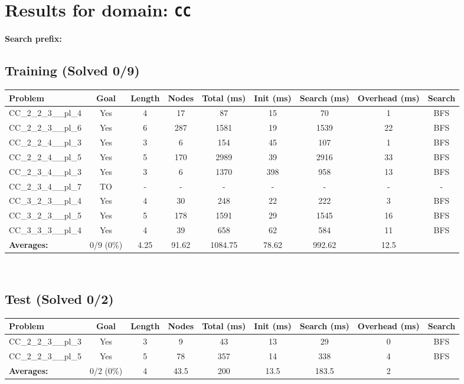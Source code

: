 \documentclass{article}
\begin{document}
\section*{Results for domain: \texttt{CC}}
\textbf{Search prefix:} 
\\[0.5cm]
\subsection*{Training (Solved 0/9)}
\begin{tabular}{lcccccccc}
\toprule
Problem & Goal & Length & Nodes & Total (ms) & Init (ms) & Search (ms) & Overhead (ms) & Search \\
\midrule
CC\_2\_2\_3\_\_pl\_4 & Yes & 4 & 17 & 87 & 15 & 70 & 1 & BFS \\
CC\_2\_2\_3\_\_pl\_6 & Yes & 6 & 287 & 1581 & 19 & 1539 & 22 & BFS \\
CC\_2\_2\_4\_\_pl\_3 & Yes & 3 & 6 & 154 & 45 & 107 & 1 & BFS \\
CC\_2\_2\_4\_\_pl\_5 & Yes & 5 & 170 & 2989 & 39 & 2916 & 33 & BFS \\
CC\_2\_3\_4\_\_pl\_3 & Yes & 3 & 6 & 1370 & 398 & 958 & 13 & BFS \\
CC\_2\_3\_4\_\_pl\_7 & TO & - & - & - & - & - & - & - \\
CC\_3\_2\_3\_\_pl\_4 & Yes & 4 & 30 & 248 & 22 & 222 & 3 & BFS \\
CC\_3\_2\_3\_\_pl\_5 & Yes & 5 & 178 & 1591 & 29 & 1545 & 16 & BFS \\
CC\_3\_3\_3\_\_pl\_4 & Yes & 4 & 39 & 658 & 62 & 584 & 11 & BFS \\
\textbf{Averages:} & 0/9 (0\%) & 4.25 & 91.62 & 1084.75 & 78.62 & 992.62 & 12.5 & \\
\bottomrule
\end{tabular}
\\[0.7cm]
\subsection*{Test (Solved 0/2)}
\begin{tabular}{lcccccccc}
\toprule
Problem & Goal & Length & Nodes & Total (ms) & Init (ms) & Search (ms) & Overhead (ms) & Search \\
\midrule
CC\_2\_2\_3\_\_pl\_3 & Yes & 3 & 9 & 43 & 13 & 29 & 0 & BFS \\
CC\_2\_2\_3\_\_pl\_5 & Yes & 5 & 78 & 357 & 14 & 338 & 4 & BFS \\
\textbf{Averages:} & 0/2 (0\%) & 4 & 43.5 & 200 & 13.5 & 183.5 & 2 & \\
\bottomrule
\end{tabular}
\\[0.7cm]
\end{document}
